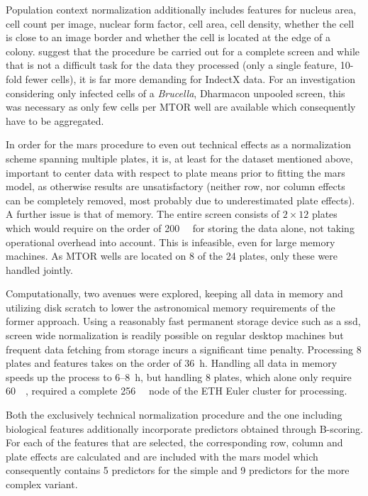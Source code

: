 Population context normalization additionally includes features for nucleus area, cell count per image, nuclear form factor, cell area, cell density, whether the cell is close to an image border and whether the cell is located at the edge of a colony. \citeauthor{Knapp2011} suggest that the procedure be carried out for a complete screen and while that is not a difficult task for the data they processed (only a single feature, 10-fold fewer cells), it is far more demanding for IndectX data. For an investigation considering only infected cells of a \textit{Brucella}, Dharmacon unpooled screen, this was necessary as only few cells per MTOR well are available which consequently have to be aggregated.

In order for the \gls{mars} procedure to even out technical effects as a normalization scheme spanning multiple plates, it is, at least for the dataset mentioned above, important to center data with respect to plate means prior to fitting the \gls{mars} model, as otherwise results are unsatisfactory (neither row, nor column effects can be completely removed, most probably due to underestimated plate effects). A further issue is that of memory. The entire screen consists of $2 \times 12$ plates which would require on the order of \SI{200}{\giga\byte} for storing the data alone, not taking operational overhead into account. This is infeasible, even for large memory machines. As MTOR wells are located on 8 of the 24 plates, only these were handled jointly.

Computationally, two avenues were explored, keeping all data in memory and utilizing disk scratch to lower the astronomical memory requirements of the former approach. Using a reasonably fast permanent storage device such as a \gls{ssd}, screen wide normalization is readily possible on regular desktop machines but frequent data fetching from storage incurs a significant time penalty. Processing 8 plates and  features takes on the order of \SI{36}{\hour}. Handling all data in memory speeds up the process to 6--\SI{8}{\hour}, but handling 8 plates, which alone only require \tilde \SI{60}{\giga\byte}, required a complete \SI{256}{\giga\byte} node of the ETH Euler cluster for processing.

Both the exclusively technical normalization procedure and the one including biological features additionally incorporate predictors obtained through B-scoring. For each of the features that are selected, the corresponding row, column and plate effects are calculated and are included with the mars model which consequently contains 5 predictors for the simple and 9 predictors for the more complex variant.

